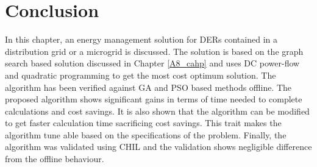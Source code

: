 \section{Conclusion}
In this chapter, an energy management solution for DERs contained in a distribution grid or a microgrid is discussed. The solution is based on the graph search based solution discussed in Chapter \ref{A8_cahp} and uses DC power-flow and quadratic programming to get the most cost optimum solution. The algorithm has been verified against GA and PSO based methods offline. The proposed algorithm shows significant gains in terms of time needed to complete calculations and cost savings. It is also shown that the algorithm can be modified to get faster calculation time sacrificing cost savings. This trait makes the algorithm tune able based on the specifications of the problem. Finally, the algorithm was validated using CHIL and the validation shows negligible difference from the offline behaviour.

